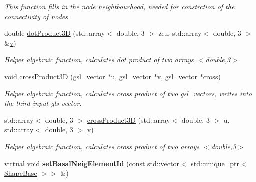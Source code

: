 \begin{DoxyCompactItemize}
\begin{DoxyCompactList}\small\item\em This function fills in the node neightbourhood, needed for constrction of the connectivity of nodes. \end{DoxyCompactList}\item 
\hypertarget{classShapeBase_a6fe3c0f97f5ea130d95cc74be439c0d1}{}double \hyperlink{classShapeBase_a6fe3c0f97f5ea130d95cc74be439c0d1}{dot\+Product3\+D} (std\+::array$<$ double, 3 $>$ \&u, std\+::array$<$ double, 3 $>$ \&\hyperlink{classShapeBase_a8b4c2d3bfbc6c9785c5181a56f929151}{v})\label{classShapeBase_a6fe3c0f97f5ea130d95cc74be439c0d1}

\begin{DoxyCompactList}\small\item\em Helper algebraic function, calculates dot product of two arrays $<$double,3$>$ \end{DoxyCompactList}\item 
\hypertarget{classShapeBase_a334a6cec6a698ac49006d8216a93ced9}{}void \hyperlink{classShapeBase_a334a6cec6a698ac49006d8216a93ced9}{cross\+Product3\+D} (gsl\+\_\+vector $\ast$u, gsl\+\_\+vector $\ast$\hyperlink{classShapeBase_a8b4c2d3bfbc6c9785c5181a56f929151}{v}, gsl\+\_\+vector $\ast$cross)\label{classShapeBase_a334a6cec6a698ac49006d8216a93ced9}

\begin{DoxyCompactList}\small\item\em Helper algebraic function, calculates cross product of two gsl\+\_\+vectors, writes into the third input gls vector. \end{DoxyCompactList}\item 
\hypertarget{classShapeBase_a52860af5f883c90296e52ddb194568ff}{}std\+::array$<$ double, 3 $>$ \hyperlink{classShapeBase_a52860af5f883c90296e52ddb194568ff}{cross\+Product3\+D} (std\+::array$<$ double, 3 $>$ u, std\+::array$<$ double, 3 $>$ \hyperlink{classShapeBase_a8b4c2d3bfbc6c9785c5181a56f929151}{v})\label{classShapeBase_a52860af5f883c90296e52ddb194568ff}

\begin{DoxyCompactList}\small\item\em Helper algebraic function, calculates cross product of two arrays $<$double,3$>$ \end{DoxyCompactList}\item 
\hypertarget{classShapeBase_a4c1d85430abf35169eb5b53ef71768ad}{}virtual void {\bfseries set\+Basal\+Neig\+Element\+Id} (const std\+::vector$<$ std\+::unique\+\_\+ptr$<$ \hyperlink{classShapeBase}{Shape\+Base} $>$$>$ \&)\label{classShapeBase_a4c1d85430abf35169eb5b53ef71768ad}


\end{DoxyCompactItemize}
